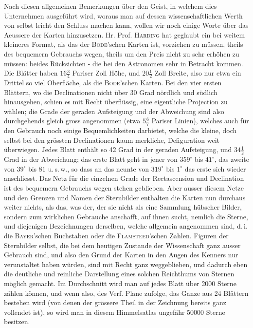 Nach diesen allgemeinen Bemerkungen über den Geist, in welchem dies Unternehmen ausgeführt wird, woraus man auf dessen wissenschaftlichen Werth von selbst leicht den Schluss machen kann, wollen wir noch einige Worte über das Aeussere der Karten hinzusetzen. Hr. Prof. \textsc{Harding} hat geglaubt ein bei weitem kleineres Format, als das der \textsc{Bode}'schen Karten ist, vorziehen zu müssen, theils des bequemern Gebrauchs wegen, theils um den Preis nicht zu sehr erhöhen zu müssen: beides Rücksichten - die bei den Astronomen sehr in Betracht kommen. Die Blätter haben $16\frac{3}{4}$ Pariser Zoll Höhe, und $20\frac{1}{2}$ Zoll Breite, also nur etwa ein Drittel so viel Oberfläche, als die \textsc{Bode}'schen Karten. Bei den vier ersten Blättern, wo die Declinationen nicht über 30 Grad nördlich und südlich hinausgehen, schien es mit Recht überflüssig, eine eigentliche Projection zu wählen; die Grade der geraden Aufsteigung und der Abweichung sind also durchgehends gleich gross angenommen (etwa $5\frac{6}{7}$ Pariser Linien), welches auch für den Gebrauch noch einige Bequemlichkeiten darbietet, welche die kleine, doch selbst bei den grössten Declinationen kaum merkliche, Defiguration weit überwiegen. Jedes Blatt enthält so 42 Grad in der geraden Aufsteigung, und $34\frac{1}{2}$ Grad in der Abweichung; das erste Blatt geht in jener von $359^\circ$ bis $41^\circ$, das zweite von $39^\circ$ bis $81$ u.\,s.\,w., so dass an das neunte von $319^\circ$ bis $1^\circ$ das erste sich wieder anschliesst. Das Netz für die einzelnen Grade der Rectascension und Declination ist des bequemern Gebrauchs wegen stehen geblieben. Aber ausser diesem Netze und den Grenzen und Namen der Sternbilder enthalten die Karten nun durchaus weiter nichts, als das, was der, der sie nicht als eine Sammlung hübscher Bilder, sondern zum wirklichen Gebrauche anschafft, auf ihnen sucht, nemlich die Sterne, und diejenigen Bezeichnungen derselben, welche allgemein angenommen sind, d.\,i. die \textsc{Bayer}'schen Buchstaben oder die \textsc{Flamsteed}'schen Zahlen. Figuren der Sternbilder selbst, die bei dem heutigen Zustande der Wissenschaft ganz ausser Gebrauch sind, und also den Grund der Karten in den Augen des Kenners nur verunstaltet haben würden, sind mit Recht ganz weggeblieben, und dadurch eben die deutliche und reinliche Darstellung eines solchen Reichthums von Sternen möglich gemacht. Im Durchschnitt wird man auf jedes Blatt über 2000 Sterne zählen können, und wenn also, des Verf. Plane zufolge, das Ganze aus 24 Blättern bestehen wird (von denen der grössere Theil in der Zeichnung bereits ganz vollendet ist), so wird man in diesem Himmelsatlas ungefähr 50000 Sterne besitzen.

